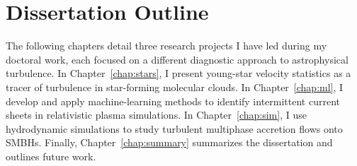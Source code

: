 \section{Dissertation Outline}

The following chapters detail three research projects I have led during my doctoral work, each focused on a different diagnostic approach to astrophysical turbulence. In Chapter~\ref{chap:stars}, I present young-star velocity statistics as a tracer of turbulence in star-forming molecular clouds. In Chapter~\ref{chap:ml}, I develop and apply machine-learning methods to identify intermittent current sheets in relativistic plasma simulations. In Chapter~\ref{chap:sim}, I use hydrodynamic simulations to study turbulent multiphase accretion flows onto SMBHs. Finally, Chapter~\ref{chap:summary} summarizes the dissertation and outlines future work.
